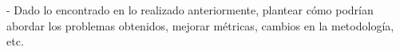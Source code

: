 - Dado lo encontrado en lo realizado anteriormente, plantear cómo podrían abordar los problemas obtenidos, mejorar métricas, cambios en la metodología, etc.
